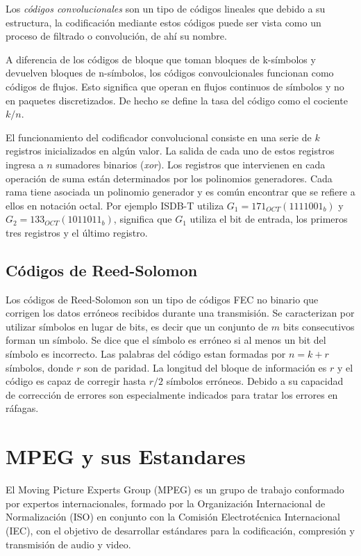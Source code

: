 Los \textit{códigos convolucionales} son un tipo de códigos lineales que debido a su estructura, la codificación mediante estos códigos puede ser vista como un proceso de filtrado o convolución, de ahí su nombre. 

A diferencia de los códigos de bloque que toman bloques de k-símbolos y devuelven bloques de n-símbolos, los códigos convoulcionales funcionan como códigos de flujos. Esto significa que operan en flujos continuos de símbolos y no en paquetes discretizados. De hecho se define la tasa del código como el cociente $k/n$.

El funcionamiento del codificador convolucional consiste en una serie de $k$ registros inicializados en algún valor. La salida de cada uno de estos registros ingresa a $n$ sumadores binarios (\textit{xor}). Los registros que intervienen en cada operación de suma están determinados por los polinomios generadores. Cada rama tiene asociada un polinomio generador y es común encontrar que se refiere a ellos en notación octal. Por ejemplo ISDB-T utiliza $G_1 = 171_{OCT} (1111001_b)$ y $G_2 = 133_{OCT} (1011011_b)$, significa que $G_1$ utiliza el bit de entrada, los primeros tres registros y el último registro. 

\subsection{Códigos de Reed-Solomon}

Los códigos de Reed-Solomon son un tipo de códigos FEC no binario que corrigen los datos erróneos recibidos durante una transmisión. Se caracterizan por utilizar símbolos en lugar de bits, es decir que un conjunto de $m$ bits consecutivos forman un símbolo. Se dice que el símbolo es erróneo si al menos un bit del símbolo es incorrecto. Las palabras del código estan formadas por $n = k +r $ símbolos, donde $r$ son de paridad. La longitud del bloque de información es $r$ y el código es capaz de corregir hasta $r/2$ símbolos erróneos. 
Debido a su capacidad de corrección de errores son especialmente indicados para tratar los errores en ráfagas.



\section{MPEG y sus Estandares}

El Moving Picture Experts Group (MPEG)\cite{MPEG} es un grupo de trabajo conformado por expertos internacionales, formado por la Organización Internacional de Normalización (ISO) en conjunto con la Comisión Electrotécnica Internacional (IEC), con el objetivo de desarrollar estándares para la codificación, compresión y transmisión de audio y video.

